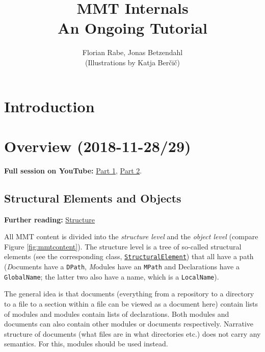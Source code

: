 \documentclass[11pt,a4paper]{article}
\author{Florian Rabe, Jonas Betzendahl\\(Illustrations by Katja Berčič)}
\title{MMT Internals\\ An Ongoing Tutorial}
\newcommand{\MMT}{\textsf{MMT}\xspace}
\begin{document}
\maketitle
{\hypersetup{hidelinks}\tableofcontents}
\bigskip

\section{Introduction}



\newpage
\section{Overview (2018-11-28/29)}
\label{sec:overview}

\textbf{Full session on YouTube:} \href{https://www.youtube.com/watch?v=PUKjQbbeqdQ}{Part 1}, \href{https://www.youtube.com/watch?v=yh_vwVm8Szc}{Part 2}.

\subsection{Structural Elements and Objects}

\textbf{Further reading:} \href{https://uniformal.github.io/doc/language/}{Structure}
\bigskip

All \MMT content is divided into the \emph{structure level} and the \emph{object level} (compare Figure \ref{fig:mmtcontent}). The structure level is a tree of so-called structural elements (see the corresponding class, \href{https://uniformal.github.io/apidoc/info/kwarc/mmt/api/StructuralElement.html}{\texttt{StructuralElement}}) that all have a path (\emph{D}ocuments have a \texttt{DPath}, \emph{M}odules have an \texttt{MPath} and Declarations have a \texttt{GlobalName}; the latter two also have a name, which is a \texttt{LocalName}).

The general idea is that documents (everything from a repository to a directory to a file to a section within a file can be viewed as a document here) contain lists of modules and modules contain lists of declarations. Both modules and documents can also contain  other modules or documents respectively. Narrative structure of documents (what files are in what directories etc.) does not carry any semantics. For this, modules should be used instead.
\end{document}
